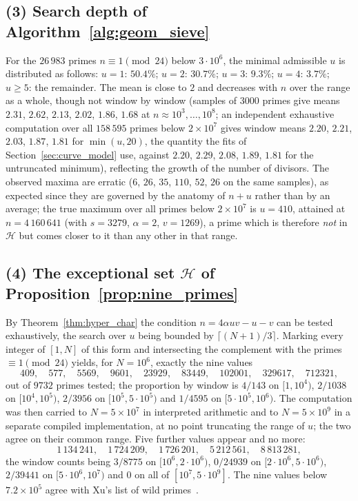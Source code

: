 \documentclass[11pt, a4paper]{article}
\theoremstyle{plain}
\theoremstyle{definition}
\begin{document}
\subsection*{(3) Search depth of Algorithm~\ref{alg:geom_sieve}}
For the $26\,983$ primes $n\equiv1\pmod{24}$ below $3\cdot10^{6}$, the minimal admissible $u$ is distributed as follows: $u=1$: $50.4\%$; $u=2$: $30.7\%$; $u=3$: $9.3\%$; $u=4$: $3.7\%$; $u\ge5$: the remainder. The mean is close to $2$ and decreases with $n$ over the range as a whole, though not window by window (samples of $3000$ primes give means $2.31$, $2.62$, $2.13$, $2.02$, $1.86$, $1.68$ at $n\approx10^{3},\dots,10^{8}$; an independent exhaustive computation over all $158\,595$ primes below $2\times10^{7}$ gives window means $2.20$, $2.21$, $2.03$, $1.87$, $1.81$ for $\min(u,20)$, the quantity the fits of Section~\ref{sec:curve_model} use, against $2.20$, $2.29$, $2.08$, $1.89$, $1.81$ for the untruncated minimum), reflecting the growth of the number of divisors. The observed maxima are erratic ($6$, $26$, $35$, $110$, $52$, $26$ on the same samples), as expected since they are governed by the anatomy of $n+u$ rather than by an average; the true maximum over all primes below $2\times10^{7}$ is $u=410$, attained at $n=4\,160\,641$ (with $s=3279$, $\alpha=2$, $v=1269$), a prime which is therefore \emph{not} in $\mathcal{H}$ but comes closer to it than any other in that range.

\subsection*{(4) The exceptional set $\mathcal{H}$ of Proposition~\ref{prop:nine_primes}}
By Theorem~\ref{thm:hyper_char} the condition $n=4\alpha uv-u-v$ can be tested exhaustively, the search over $u$ being bounded by $\lceil(N+1)/3\rceil$. Marking every integer of $[1,N]$ of this form and intersecting the complement with the primes $\equiv1\pmod{24}$ yields, for $N=10^{6}$, exactly the nine values
$$409,\quad577,\quad5569,\quad9601,\quad23929,\quad83449,\quad102001,\quad329617,\quad712321,$$
out of $9732$ primes tested; the proportion by window is $4/143$ on $[1,10^{4})$, $2/1038$ on $[10^{4},10^{5})$, $2/3956$ on $[10^{5},5\cdot10^{5})$ and $1/4595$ on $[5\cdot10^{5},10^{6})$. The computation was then carried to $N=5\times10^{7}$ in interpreted arithmetic and to $N=5\times10^{9}$ in a separate compiled implementation, at no point truncating the range of $u$; the two agree on their common range. Five further values appear and no more:
$$1\,134\,241,\quad 1\,724\,209,\quad 1\,726\,201,\quad 5\,212\,561,\quad 8\,813\,281,$$
the window counts being $3/8775$ on $[10^{6},2\cdot10^{6})$, $0/24939$ on $[2\cdot10^{6},5\cdot10^{6})$, $2/39441$ on $[5\cdot10^{6},10^{7})$ and $0$ on all of $[10^{7},5\cdot10^{9}]$. The nine values below $7.2\times10^{5}$ agree with Xu's list of wild primes~\cite{xu2026}.
\end{document}
